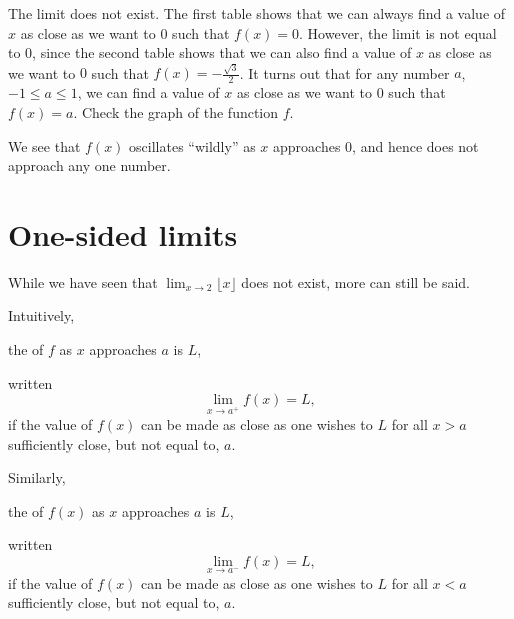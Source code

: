 \documentclass{ximera}
\begin{document}
\begin{question}
  \begin{feedback}
   The limit does not exist. The first table shows that we can always find a value of $x$ as close as we want to $0$ such that $f(x)=0$.
   However, the limit is not equal to $0$, since the second table shows that we can also find a value of $x$ as close as we want to $0$ such that $f(x)=-\frac{\sqrt{3}}{2}$.
   It turns out that  for any number $a$, $-1\le a\le1$, we can find a value of $x$ as close as we want to $0$ such that $f(x)=a$. Check the graph of the function $f$.
    \begin{image}
    \end{image}
   We see that $f(x)$ oscillates ``wildly'' as $x$ approaches $0$, and hence does not approach any one number.
  \end{feedback}
\end{question}



\section{One-sided limits}


While we have seen that $\lim_{x\to 2}\lfloor x\rfloor$ does not
exist, more can still be said.



\begin{definition}
  Intuitively,
  \begin{center}
    the  of $f$ as $x$ approaches $a$ is
    $L$,
  \end{center}
  written
  \[
  \lim_{x\to a^+} f(x) = L,
  \]
  if the value of $f(x)$ can be made as close as one wishes to $L$ for
  all $x>a$ sufficiently close, but not equal to, $a$.
  
  Similarly,
  \begin{center}
    the  of $f(x)$ as $x$ approaches $a$ is
    $L$,
  \end{center}
  written
  \[
  \lim_{x\to a^-} f(x) = L,
  \]
  if the value of $f(x)$ can be made as close as one wishes to $L$ for
  all $x<a$ sufficiently close, but not equal to, $a$.
\end{definition}
\end{document}
